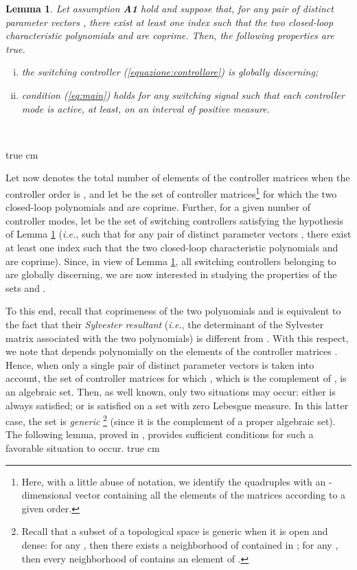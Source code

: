 \documentclass[letterpaper, 10 pt, conference]{ieeetran}
\def\qedp{\hspace*{\fill}~{\tiny }}
\def\salt{\vskip 0.2 true cm}
\newtheorem{itlemma}{Lemma}
\newenvironment{lemma}{\begin{itlemma}\rm}{\end{itlemma}}
\begin{document}
\begin{lemma} \label{lem:poly} Let assumption \textbf{A1} hold and suppose that, for any pair of distinct parameter vectors , there exist at least one index  
such that the two closed-loop characteristic polynomials  and  are coprime. Then, the following properties are true.
\begin{enumerate}[(i)]
\item the switching controller  (\ref{equazione:controllore})  is globally discerning;
\item condition (\ref{eq:main}) holds for any switching signal  such that each controller mode  is active, at least, on an interval 
of positive measure.
\end{enumerate}
\qedp
\end{lemma} \salt

Let now  denotes the total number of elements of the controller matrices  when the controller
order is , and let   be the set of  controller matrices\footnote{Here, with a little abuse
of notation, we identify the quadruples  with an -dimensional vector containing all the elements of the matrices
  according to a given order.}  for which 
the two closed-loop polynomials  and  are coprime. Further, for a given number  of controller modes, let
 be the set of switching controllers   satisfying the hypothesis of Lemma 
\ref{lem:poly} (\emph{i.e.}, such that  for any pair of distinct parameter vectors , there exist at least one index  
such that the two closed-loop characteristic polynomials  and  are coprime). Since, in view of Lemma 
\ref{lem:poly}, all switching controllers belonging to  are globally discerning, we are now interested in studying the properties of the sets
 and .

To this end, recall that coprimeness of the two polynomials  and  is equivalent to the fact that their 
\emph{Sylvester resultant}  (\emph{i.e.}, the determinant
of the Sylvester matrix associated with the two polynomials) is different from . With this respect, we note that  depends polynomially on the elements
of the controller matrices . Hence, when only a single pair of distinct parameter vectors  is taken into account,
the set of controller matrices  for which , which is the complement of , is an algebraic set.
Then, as well known, only two situations may occur: either  is always satisfied; or  is satisfied on a set with zero Lebesgue measure.
In this latter case, the set  is \emph{generic}
\footnote{Recall that a subset  of a topological space is generic when it is open and dense: for any , then there exists a neighborhood of  contained in ; for any , then every neighborhood of  contains an element of .} (since it is the complement of a proper algebraic set). The following lemma, proved in \cite{Ba13}, provides sufficient conditions for such a favorable situation to occur.
 \salt
\end{document}

